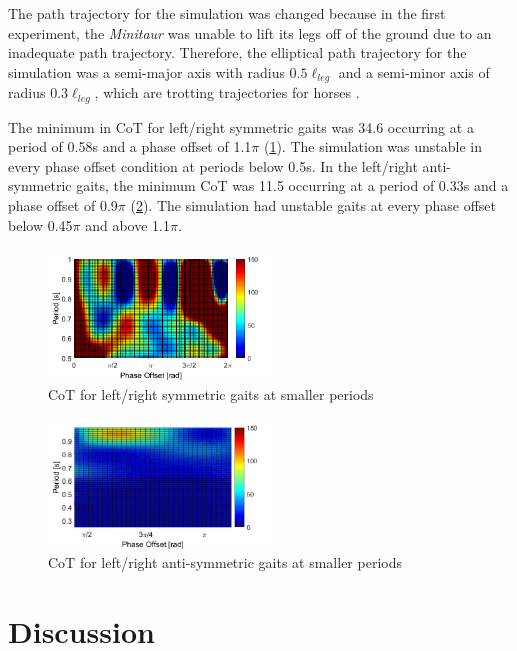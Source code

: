 \documentclass[conference,11pt,letterpaper]{IEEEtran}
\begin{document}
The path trajectory for the simulation was changed because in the first experiment, the \emph{Minitaur} was unable to lift its legs off of the ground due to an inadequate path trajectory. Therefore, the elliptical path trajectory for the simulation was a semi-major axis with radius $0.5\ell_{leg}$ and a semi-minor axis of radius $0.3\ell_{leg}$, which are trotting trajectories for horses \autocite {mcmahon_1985}.

The minimum in CoT for left/right symmetric gaits was 34.6 occurring at a period of 0.58s and a phase offset of 1.1$\pi$ (\cref{fig:sync_gait_2}). The simulation was unstable in every phase offset condition at periods below 0.5s. In the left/right anti-symmetric gaits, the minimum CoT was 11.5 occurring at a period of 0.33s and a phase offset of 0.9$\pi $ (\cref{fig:unsync_gait_2}). The simulation had unstable gaits at every phase offset below 0.45$\pi$ and above 1.1$\pi$. 
\begin{figure}[ht!]
         
           \includegraphics[width=0.53\textwidth]{sync}
           \caption{CoT for left/right symmetric gaits at smaller periods}
           \label{fig:sync_gait_2}
           \end{figure}
           
          \begin{figure}[ht!]
           \includegraphics[width=0.53\textwidth]{unsync}
           \caption{CoT for left/right anti-symmetric gaits at smaller periods}
           \label{fig:unsync_gait_2}
\end{figure}
           


\section{Discussion}
\end{document}
